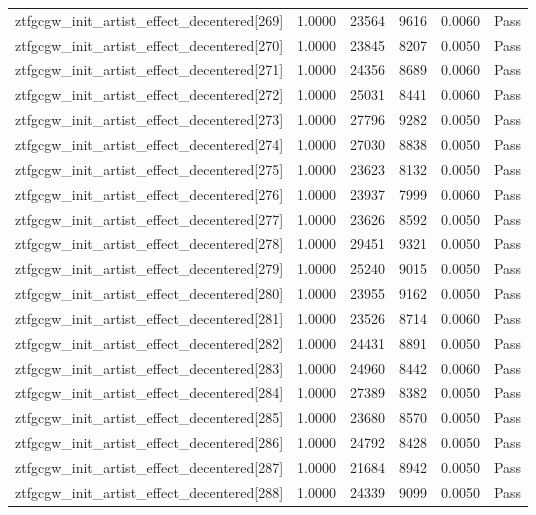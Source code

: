 \begin{table}[htbp]
\begin{tabular}{llrrll}
ztfgcgw\_init\_artist\_effect\_decentered[269] & 1.0000 & 23564 & 9616 & 0.0060 & Pass \\
ztfgcgw\_init\_artist\_effect\_decentered[270] & 1.0000 & 23845 & 8207 & 0.0050 & Pass \\
ztfgcgw\_init\_artist\_effect\_decentered[271] & 1.0000 & 24356 & 8689 & 0.0060 & Pass \\
ztfgcgw\_init\_artist\_effect\_decentered[272] & 1.0000 & 25031 & 8441 & 0.0060 & Pass \\
ztfgcgw\_init\_artist\_effect\_decentered[273] & 1.0000 & 27796 & 9282 & 0.0050 & Pass \\
ztfgcgw\_init\_artist\_effect\_decentered[274] & 1.0000 & 27030 & 8838 & 0.0050 & Pass \\
ztfgcgw\_init\_artist\_effect\_decentered[275] & 1.0000 & 23623 & 8132 & 0.0050 & Pass \\
ztfgcgw\_init\_artist\_effect\_decentered[276] & 1.0000 & 23937 & 7999 & 0.0060 & Pass \\
ztfgcgw\_init\_artist\_effect\_decentered[277] & 1.0000 & 23626 & 8592 & 0.0050 & Pass \\
ztfgcgw\_init\_artist\_effect\_decentered[278] & 1.0000 & 29451 & 9321 & 0.0050 & Pass \\
ztfgcgw\_init\_artist\_effect\_decentered[279] & 1.0000 & 25240 & 9015 & 0.0050 & Pass \\
ztfgcgw\_init\_artist\_effect\_decentered[280] & 1.0000 & 23955 & 9162 & 0.0050 & Pass \\
ztfgcgw\_init\_artist\_effect\_decentered[281] & 1.0000 & 23526 & 8714 & 0.0060 & Pass \\
ztfgcgw\_init\_artist\_effect\_decentered[282] & 1.0000 & 24431 & 8891 & 0.0050 & Pass \\
ztfgcgw\_init\_artist\_effect\_decentered[283] & 1.0000 & 24960 & 8442 & 0.0060 & Pass \\
ztfgcgw\_init\_artist\_effect\_decentered[284] & 1.0000 & 27389 & 8382 & 0.0050 & Pass \\
ztfgcgw\_init\_artist\_effect\_decentered[285] & 1.0000 & 23680 & 8570 & 0.0050 & Pass \\
ztfgcgw\_init\_artist\_effect\_decentered[286] & 1.0000 & 24792 & 8428 & 0.0050 & Pass \\
ztfgcgw\_init\_artist\_effect\_decentered[287] & 1.0000 & 21684 & 8942 & 0.0050 & Pass \\
ztfgcgw\_init\_artist\_effect\_decentered[288] & 1.0000 & 24339 & 9099 & 0.0050 & Pass \\

\end{tabular}
\end{table}
